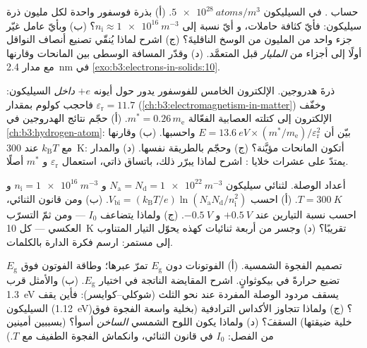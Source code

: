 \begin{exercise}[$\star\star$]\label{exo:b3:electrons-in-solids:9}
حساب . في السيليكون $\qty{5e28}{atoms/m^3}$. (أ) بذرة
فوسفور واحدة لكل مليون ذرة سيليكون: فأيّ كثافة حاملات، و
أيّ نسبة إلى $n_{\text{i}} \approx \qty{1e16}{m^{-3}}$؟ (ب) وبأيّ
عامل غيّر جزء واحد من المليون من الوسخ الناقليةَ؟ (ج)
اشرح لماذا يُنقّي تصنيع أنصاف النواقل أولًا إلى أجزاء من
\emph{المليار} قبل  المتعمَّد. (د) وقدّر
المسافة الوسطى بين المانحات وقارنها مع
مدار \qty{2.4}{nm} في \cref{exo:b3:electrons-in-solids:10}.
\end{exercise}

\begin{exercise}[$\star\star\star$]\label{exo:b3:electrons-in-solids:10}
 ذرةَ هدروجين. الإلكترون الخامس للفوسفور
يدور حول أيونه $+e$ \emph{داخل} السيليكون: فاحجب كولوم بمقدار
$\varepsilon_{\text{r}} = 11.7$
(\cref{ch:b3:electromagnetism-in-matter}) وخفّف
الإلكترون إلى كتلته العصابية الفعّالة $m^* = 0.26\,m_{\text{e}}$.
(أ) حجّم نتائج الهدروجين في \cref{ch:b3:hydrogen-atom}:
بيّن أن $E = \qty{13.6}{eV}\times(m^*/m_{\text{e}})/
\varepsilon_{\text{r}}^2$ واحسبها. (ب) وقارنها مع
$k_{\text{B}}T$ عند \qty{300}{K}: أتكون المانحات مؤيَّنة؟ (ج) وحجّم
 بالطريقة نفسها. (د) والمدار يمتدّ على عشرات
خلايا : اشرح لماذا يبرّر ذلك، باتساق ذاتي،
استعمال $\varepsilon_{\text{r}}$ و $m^*$ أصلًا.
\end{exercise}

\begin{exercise}[$\star\star\star$]\label{exo:b3:electrons-in-solids:11}
أعداد الوصلة. لثنائي سيليكون $N_{\text{a}} =
N_{\text{d}} = \qty{1e22}{m^{-3}}$ و $n_{\text{i}} =
\qty{1e16}{m^{-3}}$ و $T = \qty{300}{K}$. (أ) احسب
$V_{\text{bi}} = (k_{\text{B}}T/e)\ln(N_{\text{a}}N_{\text{d}}/
n_{\text{i}}^2)$. (ب) ومن قانون الثنائي، احسب نسبة
التيارين عند $+\qty{0.5}{V}$ و $-\qty{0.5}{V}$. (ج) ولماذا
يتضاعف $I_0$ --- ومن ثمّ التسرّب العكسي --- كل
\qty{10}{K} تقريبًا؟ (د) وجسر من أربعة ثنائيات كهذه يحوّل التيار المتناوب إلى مستمر:
ارسم فكرة الدارة بالكلمات.
\end{exercise}

\begin{exercise}[$\star\star\star$]\label{exo:b3:electrons-in-solids:12}
تصميم الفجوة الشمسية. (أ) الفوتونات دون $E_{\text{g}}$ تمرّ
عبرها؛ وطاقة الفوتون فوق $E_{\text{g}}$ تضيع حرارةً
في بيكوثوانٍ. اشرح المقايضة الناتجة في اختيار
$E_{\text{g}}$. (ب) والأمثل قرب \qty{1.3}{eV} يسقف
مردود الوصلة المفردة عند نحو الثلث
(شوكلي--كوايسر): فأين يقف السيليكون
(\qty{1.12}{eV})؟ (ج) ولماذا تتجاوز الأكداس الترادفية (بخلية واسعة الفجوة
فوق خلية ضيقتها) السقفَ؟ (د) ولماذا يكون اللوح الشمسي
\emph{الساخن} أسوأ؟ (بسببين أمينين من الفصل:
$I_0$ في قانون الثنائي، وانكماش الفجوة الطفيف مع $T$.)
\end{exercise}

